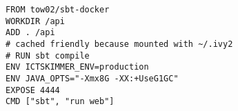 \begin{verbatim}
FROM tow02/sbt-docker
WORKDIR /api
ADD . /api
# cached friendly because mounted with ~/.ivy2
# RUN sbt compile
ENV ICTSKIMMER_ENV=production
ENV JAVA_OPTS="-Xmx8G -XX:+UseG1GC"
EXPOSE 4444
CMD ["sbt", "run web"]
\end{verbatim}